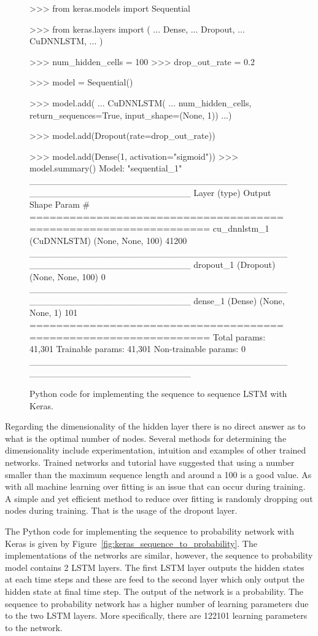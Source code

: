 \begin{figure}[!htbp]
\begin{usagepy}
>>> from keras.models import Sequential

>>> from keras.layers import (
...     Dense,
...     Dropout,
...     CuDNNLSTM,
... )

>>> num_hidden_cells = 100
>>> drop_out_rate = 0.2

>>> model = Sequential()

>>> model.add(
...    CuDNNLSTM(
...        num_hidden_cells, return_sequences=True, input_shape=(None, 1))
...)

>>> model.add(Dropout(rate=drop_out_rate))

>>> model.add(Dense(1, activation="sigmoid"))
>>> model.summary()
Model: "sequential_1"
_________________________________________________________________
Layer (type)                 Output Shape              Param #   
=================================================================
cu_dnnlstm_1 (CuDNNLSTM)     (None, None, 100)         41200     
_________________________________________________________________
dropout_1 (Dropout)          (None, None, 100)         0         
_________________________________________________________________
dense_1 (Dense)              (None, None, 1)           101       
=================================================================
Total params: 41,301
Trainable params: 41,301
Non-trainable params: 0
_________________________________________________________________

\end{usagepy}
\caption{Python code for implementing the sequence to sequence LSTM with Keras.}\label{fig:keras_sequence_to_sequence}
\end{figure}

Regarding the dimensionality of the hidden layer there is no direct answer as to
what is the optimal number of nodes. Several methods for determining the
dimensionality include experimentation, intuition and examples of other trained
networks. Trained networks and tutorial have suggested that using a number
smaller than the maximum sequence length and around a 100 is a good value. As
with all machine learning over fitting is an issue that can occur during
training. A simple and yet efficient method to reduce over fitting is randomly
dropping out nodes during training. That is the usage of the dropout layer.

The Python code for implementing the sequence to probability network with Keras
is given by Figure~\ref{fig:keras_sequence_to_probability}. The implementations
of the networks are similar, however, the sequence to probability model contains
2 LSTM layers. The first LSTM layer outputs the hidden states at each time steps
and these are feed to the second layer which only output the hidden state at
final time step. The output of the network is a probability. The sequence to
probability network has a higher number of learning parameters due to the two
LSTM layers. More specifically, there are 122101 learning parameters to the
network.

